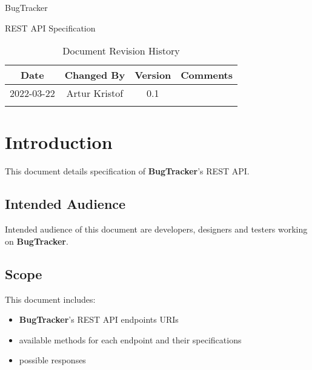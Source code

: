 \documentclass[a4paper]{article}
\newcommand{\appName}{BugTracker}
\newcommand{\appNameBold}{\textbf{BugTracker}}
\begin{document}
    \begin{titlepage}
        \vspace*{\fill}
        \begin{center}
            \huge
            \appName{}

            \vspace{0.4cm}
            \Huge
            REST API Specification

            \vspace{3cm}
            \begin{table}[h]
                \centering
                \caption{Document Revision History}
                \begin{tabular}{cccc}
                    \hline
                    Date & Changed By & Version & Comments \\
                    \hline
                    2022-03-22 & Artur Kristof & 0.1 & \hfill \\
                    \hfill & \hfill & \hfill & \hfill \\
                    \hline
                \end{tabular}
            \end{table}
        \end{center}
        \vspace*{\fill}
    \end{titlepage}

    \tableofcontents

    \section{Introduction}
    This document details specification of \appNameBold{}'s REST API.

    \subsection{Intended Audience}
    Intended audience of this document are developers, designers and testers working on \appNameBold{}.

    \subsection{Scope}
    This document includes:
    \begin{itemize}
        \item \appNameBold{}'s REST API endpoints URIs
        \item available methods for each endpoint and their specifications
        \item possible responses
    \end{itemize}
\end{document}
